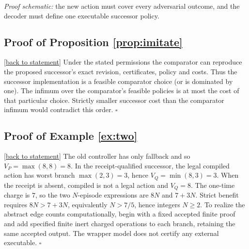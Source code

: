 \documentclass[11pt,letterpaper]{article}
\theoremstyle{definition}
\theoremstyle{remark}
\newcommand{\backlink}[1]{\hyperlink{claim:#1}{\footnotesize[back to statement]}}
\begin{document}
\begin{center}
\end{center}
\noindent\emph{Proof schematic:} the new action must cover every adversarial outcome, and the decoder must define one executable successor policy.

\hypertarget{proof:imitate}{}\subsection*{Proof of Proposition \ref{prop:imitate}}\backlink{imitate}
Under the stated permissions the comparator can reproduce the proposed successor's exact revision, certificates, policy and costs. Thus the successor implementation is a feasible comparator choice (or is dominated by one). The infimum over the comparator's feasible policies is at most the cost of that particular choice. Strictly smaller successor cost than the comparator infimum would contradict this order. $\square$

\hypertarget{proof:two}{}\subsection*{Proof of Example \ref{ex:two}}\backlink{two}
The old controller has only fallback and so $V_P=\max(8,8)=8$. In the receipt-qualified successor, the legal compiled action has worst branch $\max(2,3)=3$, hence $V_Q=\min(8,3)=3$. When the receipt is absent, compiled is not a legal action and $V_Q=8$. The one-time charge is $7$, so the two $N$-episode expressions are $8N$ and $7+3N$. Strict benefit requires $8N>7+3N$, equivalently $N>7/5$, hence integers $N\geq2$. To realize the abstract edge counts computationally, begin with a fixed accepted finite proof and add specified finite inert charged operations to each branch, retaining the same accepted output. The wrapper model does not certify any external executable. $\square$
\end{document}
